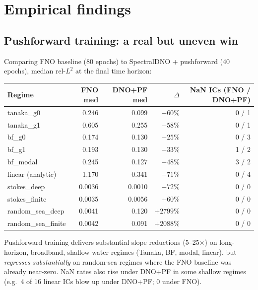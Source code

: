 \documentclass[11pt,letterpaper]{article}
\begin{document}
\section{Empirical findings}

\subsection{Pushforward training: a real but uneven win}

Comparing FNO baseline (80 epochs) to SpectralDNO + pushforward
(40 epochs), median rel-$L^{2}$ at the final time horizon:

\smallskip
\begin{center}
\small
\begin{tabular}{lrrrr}
\toprule
Regime & FNO med & DNO+PF med & $\Delta$ & NaN ICs (FNO / DNO+PF) \\
\midrule
tanaka\_g0          & 0.246  & 0.099  & $-60\%$       & 0 / 1 \\
tanaka\_g1          & 0.605  & 0.255  & $-58\%$       & 0 / 1 \\
bf\_g0              & 0.174  & 0.130  & $-25\%$       & 0 / 3 \\
bf\_g1              & 0.193  & 0.130  & $-33\%$       & 1 / 2 \\
bf\_modal           & 0.245  & 0.127  & $-48\%$       & 3 / 2 \\
linear (analytic)   & 1.170  & 0.341  & $-71\%$       & 0 / 4 \\
stokes\_deep        & 0.0036 & 0.0010 & $-72\%$       & 0 / 0 \\
stokes\_finite      & 0.0035 & 0.0056 & $+60\%$       & 0 / 0 \\
random\_sea\_deep   & 0.0041 & 0.120  & $+2799\%$     & 0 / 0 \\
random\_sea\_finite & 0.0042 & 0.091  & $+2088\%$     & 0 / 0 \\
\bottomrule
\end{tabular}
\end{center}
\smallskip

Pushforward training delivers substantial slope reductions (5--25$\times$)
on long-horizon, broadband, shallow-water regimes
(Tanaka, BF, modal, linear), but \emph{regresses substantially} on
random-sea regimes where the FNO baseline was already near-zero. NaN
rates also rise under DNO+PF in some shallow regimes (e.g.\ 4 of 16
linear ICs blow up under DNO+PF; 0 under FNO).
\end{document}
